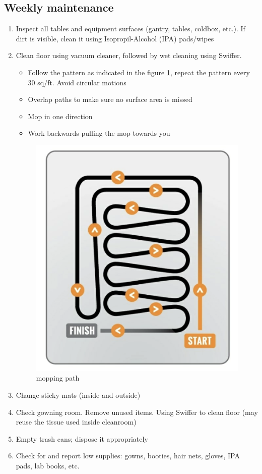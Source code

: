 \documentclass[12pt]{cornelltfpxsop}
\begin{document}
\subsection{Weekly maintenance}
\begin{enumerate}
    \item Inspect all tables and equipment surfaces (gantry, tables, coldbox, etc.). If dirt is visible, clean it using Isopropil-Alcohol (IPA) pads/wipes
    \item Clean floor using vacuum cleaner, followed by wet cleaning using Swiffer. 
        \begin{itemize}
            \item Follow the pattern as indicated in the figure \ref{moppath}, repeat the pattern every 30 sq/ft. Avoid circular motions
            \item Overlap paths to make sure no surface area is missed
            \item Mop in one direction
            \item Work backwards pulling the mop towards you
        \end{itemize}
    \begin{figure}
        \centering
        \includegraphics[width=0.8\linewidth]{img/moppath.jpg}
        \caption{mopping path}
        \label{moppath}
    \end{figure}
    \item Change sticky mats (inside and outside)
    \item Check gowning room. Remove unused items. Using Swiffer to clean floor (may reuse the tissue used inside cleanroom)
    \item Empty trash cans; dispose it appropriately
    \item Check for and report low supplies: gowns, booties, hair nets, gloves, IPA pads, lab books, etc.
    

\end{enumerate}
\end{document}
